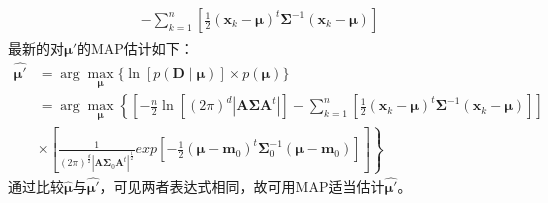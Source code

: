 \documentclass[a4paper,11pt,onecolumn,oneside,UTF8]{article}
\begin{document}
\begin{enumerate}
$$\begin{aligned}
\begin{aligned}
                      -\sum\limits_{k=1}^n \left[\frac{1}{2}\left(\bm x_k-\bm\mu\right)^t\bm
                          \Sigma^{-1}\left(\bm x_k-\bm \mu\right)\right]
                  \end{aligned}
              \end{aligned}
          $$
          最新的对$\bm\mu'$的MAP估计如下：
          $$
              \begin{aligned}
                  \hat{\bm\mu'}
                   & = \mathop{arg} \mathop{max}\limits_{\bm\mu} \{\ln\left[p\left(\bm D \mid \bm\mu\right)\right]
                  \times p\left(\bm\mu\right)\}                                                                    \\
                   & = \mathop{arg} \mathop{max}\limits_{\bm\mu} \left\{\left[-\frac{n}{2}\ln \left[\left(2\pi
                          \right)^d|\bm A\bm\Sigma\bm A^t|\right]-\sum\limits_{k=1}^n \left[\frac{1}{2}
                  \left(\bm x_k-\bm\mu\right)^t\bm\Sigma^{-1}\left(\bm x_k-\bm \mu\right)\right]\right]\right.     \\
                   & \left.\times\left[\frac{1}{\left(2\pi\right)^\frac{d}{2}|\bm A\bm\Sigma_0\bm A^t|^
                      \frac{1}{2}}exp[-\frac{1}{2}\left(\bm\mu-\bm m_0\right)^t\bm\Sigma_0^{-1}\left(\bm\mu-
                  \bm m_0\right)]\right]\right\}
              \end{aligned}
          $$
          通过比较$\hat{\bm\mu}$与$\hat{\bm\mu'}$，可见两者表达式相同，故可用MAP适当估计$\hat{\bm\mu'}$。
\end{enumerate}

\end{document}
